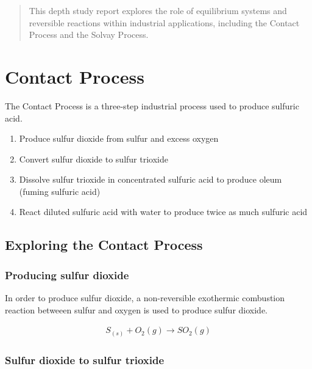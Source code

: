 \documentclass[12pt, a4paper]{article}
\begin{document}
\maketitle

\begin{abstract}
This depth study report explores the role of equilibrium systems and reversible reactions within industrial applications, including the Contact Process and the Solvay Process.
\end{abstract}




\section{Contact Process}

The Contact Process is a three-step industrial process used to produce sulfuric acid. 

\begin{enumerate}
	\item Produce sulfur dioxide from sulfur and excess oxygen
	\item Convert sulfur dioxide to sulfur trioxide
	\item Dissolve sulfur trioxide in concentrated sulfuric acid to produce oleum (fuming sulfuric acid)
	\item React diluted sulfuric acid with water to produce twice as much sulfuric acid
\end{enumerate}

\subsection{Exploring the Contact Process}

\subsubsection{Producing sulfur dioxide}

In order to produce sulfur dioxide, a non-reversible exothermic combustion reaction betweeen sulfur and oxygen is used to produce sulfur dioxide.

\begin{align}
S_{(s)} + O_{2}(g) \rightarrow SO_{2}(g)
\end{align}

\subsubsection{Sulfur dioxide to sulfur trioxide}
\end{document}
